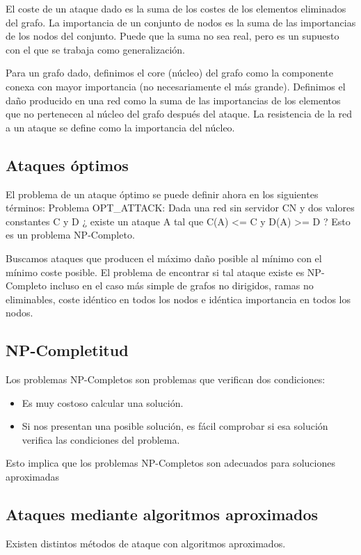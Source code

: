 El coste de un ataque dado es la suma de los costes de los elementos eliminados del grafo. La importancia de un conjunto de nodos es la suma de las importancias de los nodos del conjunto. Puede que la suma no sea real, pero es un supuesto con el que se trabaja como generalización. 

Para un grafo dado, definimos el core (núcleo) del grafo como la componente conexa con mayor importancia (no necesariamente el más grande). Definimos el daño producido en una red como la suma de las importancias de los elementos que no pertenecen al núcleo del grafo después del ataque. La resistencia de la red a un ataque se define como la importancia del núcleo.

\subsection{Ataques óptimos}
El problema de un ataque óptimo se puede definir ahora en los siguientes términos:
Problema OPT\_ATTACK: Dada una red sin servidor CN y dos valores constantes C y D ¿ existe un ataque A tal que C(A) <= C y D(A) >= D ? Esto es un problema NP-Completo.

Buscamos ataques que producen el máximo daño posible al mínimo con el mínimo coste posible. El problema de encontrar si tal ataque existe es NP-Completo incluso en el caso más simple de grafos no dirigidos, ramas no eliminables, coste idéntico en todos los nodos e idéntica importancia en todos los nodos.

\subsection{NP-Completitud}
Los problemas NP-Completos son problemas que verifican dos condiciones:
\begin{itemize}
\item Es muy costoso calcular una solución.
\item Si nos presentan una posible solución, es fácil comprobar si esa solución verifica las condiciones del problema.
\end{itemize}
Esto implica que los problemas NP-Completos son adecuados para soluciones aproximadas

\subsection{Ataques mediante algoritmos aproximados}
Existen distintos métodos de ataque con algoritmos aproximados.

